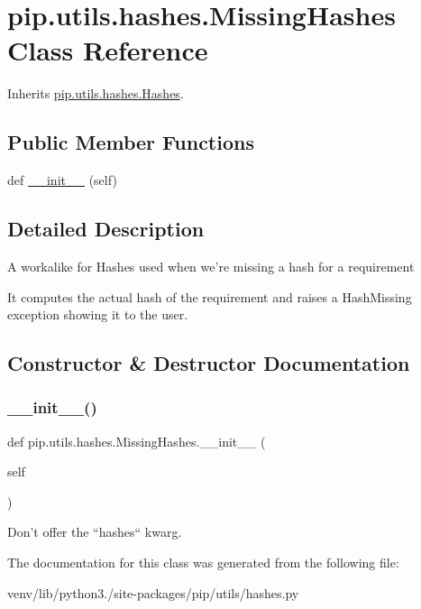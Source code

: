 \hypertarget{classpip_1_1utils_1_1hashes_1_1_missing_hashes}{}\section{pip.\+utils.\+hashes.\+Missing\+Hashes Class Reference}
\label{classpip_1_1utils_1_1hashes_1_1_missing_hashes}


Inherits \hyperlink{classpip_1_1utils_1_1hashes_1_1_hashes}{pip.\+utils.\+hashes.\+Hashes}.

\subsection*{Public Member Functions}
\begin{DoxyCompactItemize}
\item 
def \hyperlink{classpip_1_1utils_1_1hashes_1_1_missing_hashes_a44a87cc1e26de3a304a7e6172eaad932}{\+\_\+\+\_\+init\+\_\+\+\_\+} (self)
\end{DoxyCompactItemize}


\subsection{Detailed Description}
\begin{DoxyVerb}A workalike for Hashes used when we're missing a hash for a requirement

It computes the actual hash of the requirement and raises a HashMissing
exception showing it to the user.\end{DoxyVerb}
 

\subsection{Constructor \& Destructor Documentation}
\mbox{\label{classpip_1_1utils_1_1hashes_1_1_missing_hashes_a44a87cc1e26de3a304a7e6172eaad932}} 
\subsubsection{\texorpdfstring{\+\_\+\+\_\+init\+\_\+\+\_\+()}{\_\_init\_\_()}}
{\footnotesize\ttfamily def pip.\+utils.\+hashes.\+Missing\+Hashes.\+\_\+\+\_\+init\+\_\+\+\_\+ (\begin{DoxyParamCaption}\item[{}]{self }\end{DoxyParamCaption})}

\begin{DoxyVerb}Don't offer the ``hashes`` kwarg.\end{DoxyVerb}
 

The documentation for this class was generated from the following file\+:\begin{DoxyCompactItemize}
\item 
venv/lib/python3./site-\/packages/pip/utils/hashes.\+py\end{DoxyCompactItemize}
